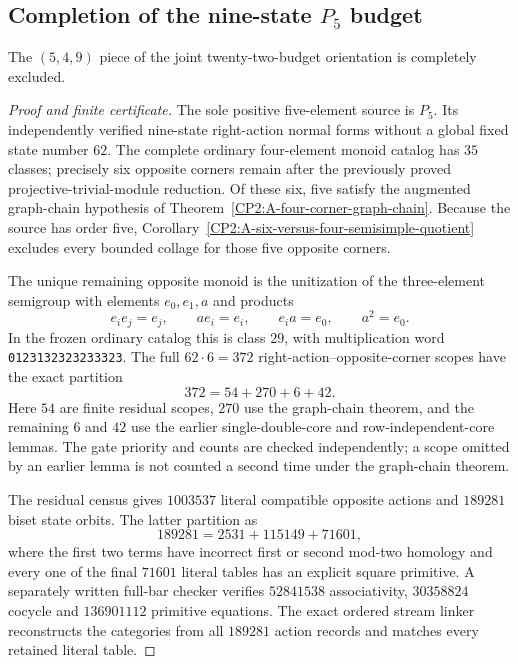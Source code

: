 \subsection{Completion of the nine-state $P_5$ budget}

\begin{proposition}
\label{CP2:A-p5-nine-graph-complete}
The $(5,4,9)$ piece of the joint twenty-two-budget orientation is
completely excluded.
\end{proposition}
\begin{proof}[Proof and finite certificate]
The sole positive five-element source is $P_5$.  Its independently
verified nine-state right-action normal forms without a global fixed
state number $62$.  The complete ordinary four-element monoid catalog
has $35$ classes; precisely six opposite corners remain after the
previously proved projective-trivial-module reduction.  Of these six,
five satisfy the augmented graph-chain hypothesis of
Theorem~\ref{CP2:A-four-corner-graph-chain}.  Because the source has
order five, Corollary~\ref{CP2:A-six-versus-four-semisimple-quotient}
excludes every bounded collage for those five opposite corners.

The unique remaining opposite monoid is the unitization of the
three-element semigroup with elements $e_0,e_1,a$ and products
\[
 e_i e_j=e_j,\qquad ae_i=e_i,\qquad e_i a=e_0,
 \qquad a^2=e_0.
\]
In the frozen ordinary catalog this is class $29$, with multiplication
word \texttt{0123132323233323}.  The full $62\cdot6=372$
right-action--opposite-corner scopes have the exact partition
\[
 372=54+270+6+42.
\]
Here $54$ are finite residual scopes, $270$ use the graph-chain theorem,
and the remaining $6$ and $42$ use the earlier single-double-core and
row-independent-core lemmas.  The gate priority and counts are checked
independently; a scope omitted by an earlier lemma is not counted a
second time under the graph-chain theorem.

The residual census gives $1003537$ literal compatible opposite actions
and $189281$ biset state orbits.  The latter partition as
\[
 189281=2531+115149+71601,
\]
where the first two terms have incorrect first or second mod-two
homology and every one of the final $71601$ literal tables has an
explicit square primitive.  A separately written full-bar checker
verifies $52841538$ associativity, $30358824$ cocycle and
$136901112$ primitive equations.  The exact ordered stream linker
reconstructs the categories from all $189281$ action records and
matches every retained literal table.


\end{proof}
